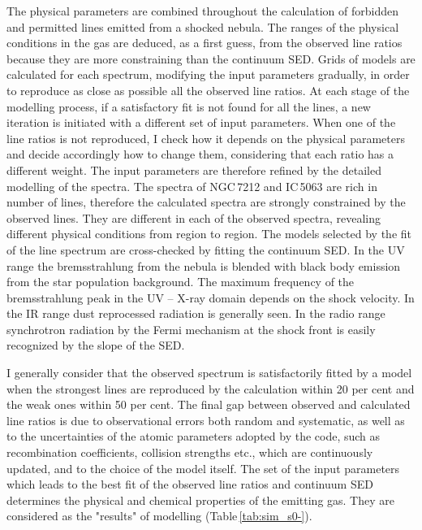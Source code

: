 \documentclass[../main.tex]{subfiles}
\begin{document}
The physical parameters are combined throughout the calculation of forbidden and permitted lines emitted from a shocked nebula.
The ranges of the physical conditions in the gas are deduced, as a first guess, from the observed line ratios because they are more constraining than the continuum SED.
Grids of models are calculated for each spectrum, modifying the input parameters gradually, in order to reproduce as close as possible all the observed line ratios.
At each stage of the modelling process, if a satisfactory fit is not found for all the lines, a new iteration is initiated with a different set of input parameters. 
When one of the line ratios is not reproduced, I check how it depends on the physical parameters and decide accordingly how to change them, considering that each ratio has a different weight.
The input parameters are therefore refined by the detailed modelling of the spectra.
The spectra of NGC\,7212 and IC\,5063 are rich in number of lines, therefore the calculated spectra are strongly constrained by the observed lines. 
They are different in each of the observed spectra, revealing different physical conditions from region to region. 
The models selected  by the fit of the line spectrum  are cross-checked by fitting the continuum SED.
In the UV range the bremsstrahlung from the  nebula is blended with black body emission from the star population background. 
The maximum frequency of the bremsstrahlung peak in the UV -- X-ray domain depends on the shock velocity. 
In the IR range dust reprocessed radiation is generally seen.  
In the radio range synchrotron radiation by the Fermi mechanism at the shock front is easily recognized by the slope of the SED.


I generally consider that the observed spectrum is satisfactorily fitted by a model when the strongest lines are
reproduced by the calculation within 20 per cent and the weak ones within 50 per cent.
The final gap between observed and calculated line ratios is due to observational errors both random and systematic, as well as to the uncertainties of the atomic parameters  adopted by the code, such as recombination coefficients, collision strengths etc., which are continuously updated, and to the choice of the model itself.
The set of the input parameters which leads to the best fit of the observed line ratios and continuum SED determines the physical and chemical properties of the emitting gas. 
They are considered as the "results" of modelling (Table\,\ref{tab:sim_s0-}). 
\end{document}

